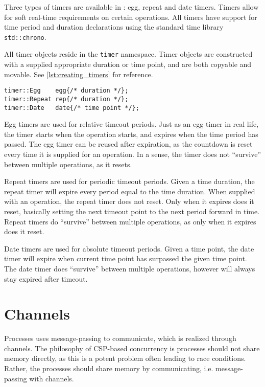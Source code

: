 Three types of timers are available in \Proxc{}: egg, repeat and date timers. Timers allow for soft real\hyp{}time requirements on certain operations. All timers have support for time period and duration declarations using the standard time library \lstinline[style={CustomC++}]|std::chrono|.

All timer objects reside in the \lstinline[style={CustomC++}]|timer| namespace. Timer objects are constructed with a supplied appropriate duration or time point, and are both copyable and movable. See \cref{lst:creating_timers} for reference. 

\begin{lstfloat}
\begin{lstlisting}[caption={Constructing different timers.}, label={lst:creating_timers}, style={CustomC++}, xleftmargin={2em}]
timer::Egg    egg{/* duration */};
timer::Repeat rep{/* duration */};
timer::Date   date{/* time point */};
\end{lstlisting}
\end{lstfloat}

Egg timers are used for relative timeout periods. Just as an egg timer in real life, the timer starts when the operation starts, and expires when the time period has passed. The egg timer can be reused after expiration, as the countdown is reset every time it is supplied for an operation. In a sense, the timer does not ``survive'' between multiple operations, as it resets.

Repeat timers are used for periodic timeout periods. Given a time duration, the repeat timer will expire every period equal to the time duration. When supplied with an operation, the repeat timer does not reset. Only when it expires does it reset, basically setting the next timeout point to the next period forward in time. Repeat timers do ``survive'' between multiple operations, as only when it expires does it reset. 

Date timers are used for absolute timeout periods. Given a time point, the date timer will expire when current time point has surpassed the given time point. The date timer does ``survive'' between multiple operations, however will always stay expired after timeout. 


\section{Channels}


Processes uses message\hyp{}passing to communicate, which is realized through channels. The philosophy of CSP\hyp{}based concurrency is processes should not share memory directly, as this is a potent problem often leading to race conditions. Rather, the processes should share memory by communicating, i.e. message\hyp{}passing with channels.

